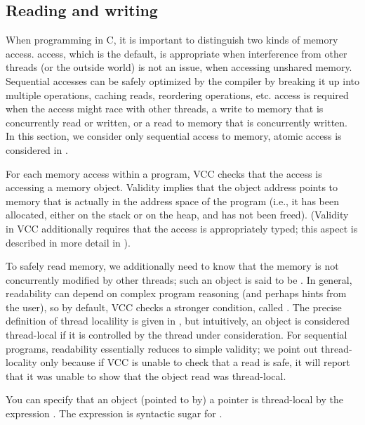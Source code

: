 \subsection{Reading and writing}
\label{sect:writes}
When programming in C, it is important to distinguish two kinds of
memory access.  access, which is the default, is appropriate when
interference from other threads (or the outside world) is not an
issue, \eg when accessing unshared memory. Sequential accesses can be
safely optimized by the compiler by breaking it up into multiple
operations, caching reads, reordering operations, etc. 
 access is required when the access might race with other
threads, \eg a write to memory that is concurrently read or written,
or a read to memory that is concurrently written. In this section, we
consider only sequential access to memory, atomic access is considered
in . 

For each memory access within a program, VCC checks that the access is accessing a 
 memory object. Validity implies that the object address
points to memory that is actually in the address space of the program
(i.e., it has been allocated, either on the stack or on the heap, and
has not been freed). (Validity in VCC additionally requires that the
access is appropriately typed; this aspect is 
described in more detail in ). 

To safely read memory, we additionally need to know that the memory
is not concurrently modified by other threads; such an object is said
to be . In general, readability can depend on complex
program reasoning (and perhaps hints from the user), so by default,
VCC checks a stronger condition, called . The precise definition of thread localility is given in 
, but intuitively, an object is
considered thread-local if it is controlled by the thread under
consideration. For sequential programs, readability essentially
reduces to simple validity; we point out thread-locality only because
if VCC is unable to check that a read is safe, it will report that it
was unable to show that the object read was thread-local.

You can specify that an object (pointed to by) a pointer  is
thread-local by the expression . 
The expression  is
syntactic sugar for .


